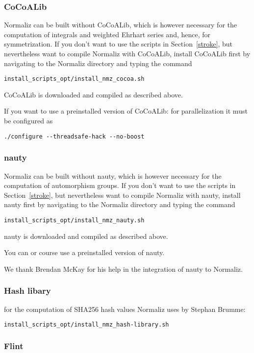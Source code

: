 \documentclass[12pt,a4paper]{scrartcl}
\theoremstyle{definition}
\begin{document}
\subsubsection{CoCoALib}

Normaliz can be built without CoCoALib, which is however necessary for the computation of integrals and weighted Ehrhart series and, hence, for symmetrization. If you don't want to use the scripts in Section~\ref{stroke}, but nevertheless want to compile Normaliz with CoCoALib, install CoCoALib first by navigating to the Normaliz directory and typing the command
\begin{Verbatim}
install_scripts_opt/install_nmz_cocoa.sh
\end{Verbatim}
CoCoALib is downloaded and compiled as described above.

If you want to use a preinstalled version of CoCoALib: for parallelization it must be configured as
\begin{Verbatim}
./configure --threadsafe-hack --no-boost 
\end{Verbatim}

\subsubsection{nauty}

Normaliz can be built without nauty, which is however necessary for the computation of automorphism groups. If you don't want to use the scripts in Section~\ref{stroke}, but nevertheless want to compile Normaliz with nauty, install nauty first by navigating to the Normaliz directory and typing the command
\begin{Verbatim}
install_scripts_opt/install_nmz_nauty.sh
\end{Verbatim}
nauty is downloaded and compiled as described above.

You can or course use a preinstalled version of nauty.

We thank Brendan McKay for his help in the integration of nauty to Normaliz.

\subsubsection{Hash libary}
for the computation of SHA256 hash values Normaliz uses by Stephan Brumme:
\begin{Verbatim}
install_scripts_opt/install_nmz_hash-library.sh
\end{Verbatim}

\subsubsection{Flint}
\end{document}
